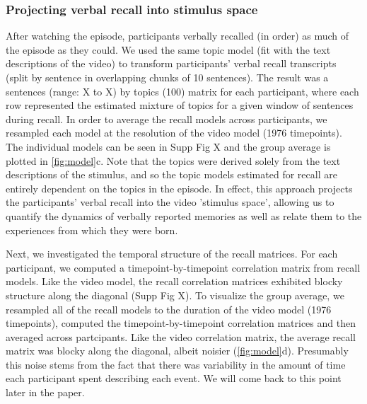 \documentclass[a4paper,man,natbib,floatsintext]{apa6}
\begin{document}
\subsubsection{Projecting verbal recall into stimulus space}
After watching the episode, participants verbally recalled (in order) as much of the episode as they could.  We used the same topic model (fit with the text descriptions of the video) to transform participants' verbal recall transcripts (split by sentence in overlapping chunks of 10 sentences). The result was a sentences (range: X to X) by topics (100) matrix for each participant, where each row represented the estimated mixture of topics for a given window of sentences during recall. In order to average the recall models across participants, we resampled each model at the resolution of the video model (1976 timepoints). The individual models can be seen in Supp Fig X and the group average is plotted in \ref{fig:model}c. Note that the topics were derived solely from the text descriptions of the stimulus, and so the topic models estimated for recall are entirely dependent on the topics in the episode. In effect, this approach projects the participants' verbal recall into the video 'stimulus space', allowing us to quantify the dynamics of verbally reported memories as well as relate them to the experiences from which they were born.

Next, we investigated the temporal structure of the recall matrices. For each participant, we computed a timepoint-by-timepoint correlation matrix from recall models. Like the video model, the recall correlation matrices exhibited blocky structure along the diagonal (Supp Fig X). To visualize the group average, we resampled all of the recall models to the duration of the video model (1976 timepoints), computed the timepoint-by-timepoint correlation matrices and then averaged across partcipants.  Like the video correlation matrix, the average recall matrix was blocky along the diagonal, albeit noisier (\ref{fig:model}d).  Presumably this noise stems from the fact that there was variability in the amount of time each participant spent describing each event. We will come back to this point later in the paper.
\end{document}
